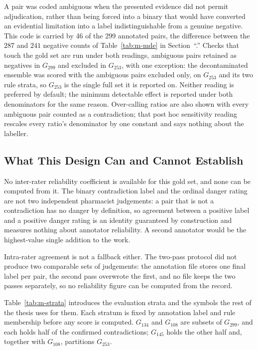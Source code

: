 A pair was coded ambiguous when the presented evidence did not permit adjudication, rather than
being forced into a binary that would have converted an evidential limitation into a label
indistinguishable from a genuine negative. This code is carried by 46 of the 299 annotated pairs, the
difference between the $287$ and $241$ negative counts of Table~\ref{tab:m-mde} in Section~``.'' Checks
that touch the gold set are run under both readings, ambiguous pairs retained as negatives in
$G_{299}$ and excluded in $G_{253}$, with one exception: the decontaminated ensemble was scored with the ambiguous pairs excluded only,
on $G_{253}$ and its two rule strata, so $G_{253}$ is the single full set it is reported on. Neither reading
is preferred by default; the minimum detectable effect
is reported under both denominators for the same reason. Over-calling ratios are also shown with
every ambiguous pair counted as a contradiction; that post hoc sensitivity reading rescales every
ratio's denominator by one constant and says nothing about the labeller.

\subsection{What This Design Can and Cannot Establish}

No inter-rater reliability coefficient is available for this gold set, and none can be computed
from it. The binary contradiction label and the ordinal danger rating are not two independent
pharmacist judgements: a pair that is not a contradiction has no danger by definition, so agreement
between a positive label and a positive danger rating is an identity guaranteed by construction and
measures nothing about annotator reliability. A second annotator would be the highest-value single addition to the work.

Intra-rater agreement is not a fallback either. The two-pass protocol did not produce two
comparable sets of judgements: the annotation file stores one final label per pair, the
second pass overwrote the first, and no file keeps the two passes separately, so no
reliability figure can be computed from the record. 

Table~\ref{tab:m-strata} introduces the evaluation strata and the symbols the rest of the thesis uses
for them. Each stratum is fixed by annotation label and rule membership before any score is computed.
$G_{134}$ and $G_{108}$ are subsets of $G_{299}$, and each holds half of the confirmed contradictions;
$G_{145}$ holds the other half and, together with $G_{108}$, partitions $G_{253}$.


